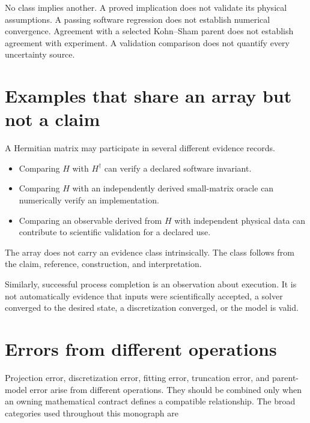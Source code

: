 No class implies another. A proved implication does not validate its physical
assumptions. A passing software regression does not establish numerical
convergence. Agreement with a selected Kohn--Sham parent does not establish
agreement with experiment. A validation comparison does not quantify every
uncertainty source.


\section{Examples that share an array but not a claim}

A Hermitian matrix may participate in several different evidence records.

\begin{itemize}
  \item Comparing \(H\) with \(H^{\dagger}\) can verify a declared software
        invariant.
  \item Comparing \(H\) with an independently derived small-matrix oracle can
        numerically verify an implementation.
  \item Comparing an observable derived from \(H\) with independent physical
        data can contribute to scientific validation for a declared use.
\end{itemize}

The array does not carry an evidence class intrinsically. The class follows
from the claim, reference, construction, and interpretation.

Similarly, successful process completion is an observation about execution. It
is not automatically evidence that inputs were scientifically accepted, a
solver converged to the desired state, a discretization converged, or the model
is valid.

\section{Errors from different operations}

Projection error, discretization error, fitting error, truncation error, and
parent-model error arise from different operations. They should be combined
only when an owning mathematical contract defines a compatible relationship.
The broad categories used throughout this monograph are

